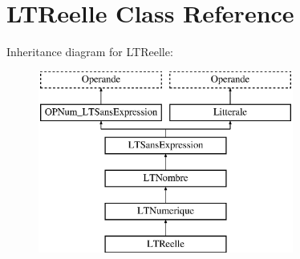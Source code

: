 \hypertarget{class_l_t_reelle}{}\section{L\+T\+Reelle Class Reference}
\label{class_l_t_reelle}
Inheritance diagram for L\+T\+Reelle\+:\begin{figure}[H]
\begin{center}
\leavevmode
\includegraphics[height=6.000000cm]{class_l_t_reelle}
\end{center}
\end{figure}
